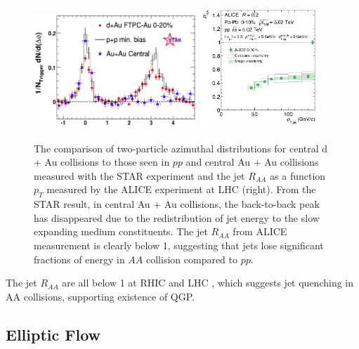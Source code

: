 \begin{figure}[hbtp]
\begin{center}
\includegraphics[width=0.55\textwidth]{Figures/Chapter1/HadronAngularSTAR.png}
\includegraphics[width=0.40\textwidth]{Figures/Chapter1/JetRAAALICE.png}
\caption{The comparison of two-particle azimuthal distributions for central d + Au collisions to those seen in $pp$ and central Au + Au collisions measured with the STAR experiment and the jet $R_{AA}$ as a function $p_T$ measured by the ALICE experiment at LHC (right). From the STAR result, in central Au + Au collisions, the back-to-back peak has disappeared due to the redistribution of jet energy to the slow expanding medium constituents. The jet $R_{AA}$ from ALICE measurement is clearly below 1, suggesting that jets lose significant fractions of energy in $AA$ collision compared to $pp$.}
\label{JetRAA}
\end{center}
\end{figure} 

The jet $R_{AA}$ are all below 1 at RHIC and LHC \cite{ALICEJetRef,CMSJetSub}, which suggests jet quenching in AA collisions, supporting existence of QGP.

\subsection{Elliptic Flow} 

